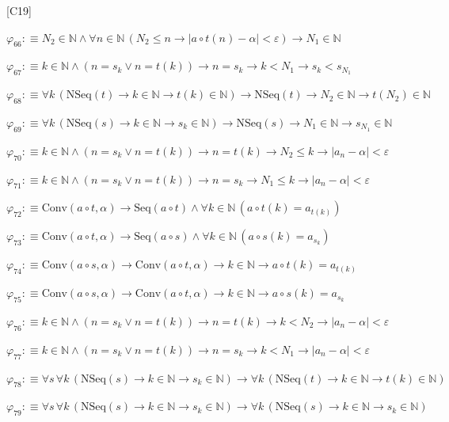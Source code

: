 \begin{fullproof}{[C19]}
\begin{abbrevlist}
\item $\varphi_{66} :\equiv N_{2} \in \mathbb{N} \land \forall n \in \mathbb{N}\,(N_{2} \leq n \to \lvert a \circ t(n) - \alpha \rvert < \varepsilon) \to N_{1} \in \mathbb{N}$
\item $\varphi_{67} :\equiv k \in \mathbb{N} \land (n = s_{k} \lor n = t(k)) \to n = s_{k} \to k < N_{1} \to s_{k} < s_{N_{1}}$
\item $\varphi_{68} :\equiv \forall k\,(\mathrm{NSeq}(t) \to k \in \mathbb{N} \to t(k) \in \mathbb{N}) \to \mathrm{NSeq}(t) \to N_{2} \in \mathbb{N} \to t(N_{2}) \in \mathbb{N}$
\item $\varphi_{69} :\equiv \forall k\,(\mathrm{NSeq}(s) \to k \in \mathbb{N} \to s_{k} \in \mathbb{N}) \to \mathrm{NSeq}(s) \to N_{1} \in \mathbb{N} \to s_{N_{1}} \in \mathbb{N}$
\item $\varphi_{70} :\equiv k \in \mathbb{N} \land (n = s_{k} \lor n = t(k)) \to n = t(k) \to N_{2} \leq k \to \lvert a_{n} - \alpha \rvert < \varepsilon$
\item $\varphi_{71} :\equiv k \in \mathbb{N} \land (n = s_{k} \lor n = t(k)) \to n = s_{k} \to N_{1} \leq k \to \lvert a_{n} - \alpha \rvert < \varepsilon$
\item $\varphi_{72} :\equiv \mathrm{Conv}(a \circ t,\alpha) \to \mathrm{Seq}(a \circ t) \land \forall k \in \mathbb{N}\,(a \circ t(k) = a_{t(k)})$
\item $\varphi_{73} :\equiv \mathrm{Conv}(a \circ t,\alpha) \to \mathrm{Seq}(a \circ s) \land \forall k \in \mathbb{N}\,(a \circ s(k) = a_{s_{k}})$
\item $\varphi_{74} :\equiv \mathrm{Conv}(a \circ s,\alpha) \to \mathrm{Conv}(a \circ t,\alpha) \to k \in \mathbb{N} \to a \circ t(k) = a_{t(k)}$
\item $\varphi_{75} :\equiv \mathrm{Conv}(a \circ s,\alpha) \to \mathrm{Conv}(a \circ t,\alpha) \to k \in \mathbb{N} \to a \circ s(k) = a_{s_{k}}$
\item $\varphi_{76} :\equiv k \in \mathbb{N} \land (n = s_{k} \lor n = t(k)) \to n = t(k) \to k < N_{2} \to \lvert a_{n} - \alpha \rvert < \varepsilon$
\item $\varphi_{77} :\equiv k \in \mathbb{N} \land (n = s_{k} \lor n = t(k)) \to n = s_{k} \to k < N_{1} \to \lvert a_{n} - \alpha \rvert < \varepsilon$
\item $\varphi_{78} :\equiv \forall s\,\forall k\,(\mathrm{NSeq}(s) \to k \in \mathbb{N} \to s_{k} \in \mathbb{N}) \to \forall k\,(\mathrm{NSeq}(t) \to k \in \mathbb{N} \to t(k) \in \mathbb{N})$
\item $\varphi_{79} :\equiv \forall s\,\forall k\,(\mathrm{NSeq}(s) \to k \in \mathbb{N} \to s_{k} \in \mathbb{N}) \to \forall k\,(\mathrm{NSeq}(s) \to k \in \mathbb{N} \to s_{k} \in \mathbb{N})$

\end{abbrevlist}
\end{fullproof}
